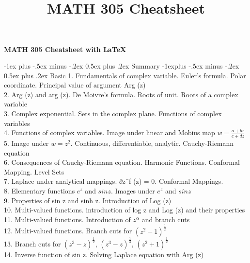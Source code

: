 \documentclass[10pt,landscape]{article}
\title{MATH 305 Cheatsheet}
\makeatletter
\renewcommand{\section}{\@startsection{section}{1}{0mm}%
                                {-1ex plus -.5ex minus -.2ex}%
                                {0.5ex plus .2ex}%
                                {\normalfont\large\bfseries}}
\renewcommand{\subsection}{\@startsection{subsection}{2}{0mm}%
                                {-1explus -.5ex minus -.2ex}%
                                {0.5ex plus .2ex}%
                                {\normalfont\normalsize\bfseries}}
\theoremstyle{definition}
\theoremstyle{remark}
\makeatother
\begin{document}
\raggedright
\footnotesize

\begin{center}
     \Large{\textbf{MATH 305 Cheatsheet with \LaTeX}} \\
\end{center}
\begin{multicols}{3}
\setlength{\premulticols}{1pt}
\setlength{\postmulticols}{1pt}
\setlength{\multicolsep}{1pt}
\setlength{\columnsep}{2pt}

\section{Summary}
\subsection{Basic}
1. Fundamentals of complex variable. Euler’s formula. Polar coordinate. Principal value of argument Arg (z)\\
2. Arg (z) and arg (z). De Moivre’s formula. Roots of unit. Roots of a
complex variable \\
3. Complex exponential. Sets in the complex plane. Functions of complex
variables \\
4. Functions of complex variables. Image under linear and Mobius map $w = \frac{a+bz}{c+dz}$\\
5. Image under $w = z^2$. Continuous, differentiable, analytic. Cauchy-Riemann equation\\
6. Consequences of Cauchy-Riemann equation. Harmonic Functions. Conformal Mapping. Level Sets\\
7. Laplace under analytical mappings. ∂z¯f (z) = 0. Conformal Mappings. \\
8. Elementary functions $e^z$ and $sin z$. Images under $e^z$ and $sin z$ \\
9. Properties of sin z and sinh z. Introduction of Log (z)\\
10. Multi-valued functions. introduction of log z and Log (z) and their properties \\
11. Multi-valued functions. Introduction of $z^\alpha$ and branch cuts \\
12. Multi-valued functions. Branch cuts for $(z^2-1)^\frac{1}{2}$ \\
13. Branch cuts for $(z^3-z)^{\frac{1}{2}}$, $(z^3-z)^{\frac{1}{3}}$, $(z^2+1)^{\frac{1}{2}}$ \\
14. Inverse function of sin z. Solving Laplace equation with Arg (z) \\

\end{multicols}
\end{document}
